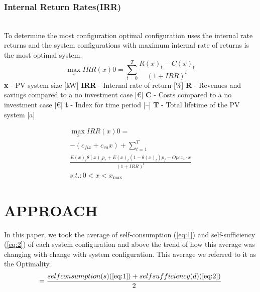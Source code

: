 \documentclass[sigconf,12pt,nonacm]{acmart}
\begin{document}
\subsubsection{Internal Return Rates(IRR)}
\hfill\\
To determine the most configuration optimal configuration \citeauthor{hartner_2017_optimal} \cite{hartner_2017_optimal} uses the internal rate returns and the system configurations with maximum internal rate of returns is the most optimal system. \newline
\begin{equation}\max _{x} I R R(x) 0=\sum_{t=0}^{T} \frac{R(x)_{t}-C(x)_{t}}{(1+I R R)^{t}}\end{equation}
\textbf{x} - PV system size [kW]\newline
\textbf{IRR }- Internal rate of return [\%]\newline
\textbf{R} - Revenues and savings compared to a no investment case [€] \newline
\textbf{C} - Costs compared to a no investment case [€] \newline
\textbf{t} - Index for time period [–] \newline
\textbf{T} - Total lifetime of the PV system [a] \newline

\begin{equation}\begin{array}{c}
\max _{x} I R R(x) 0= \\
-\left(c_{f i x}+c_{v a} x\right)+\sum_{t=1}^{T}\\ \frac{E(x)_{t} \theta(x)_{t} p_{r}+E(x)_{t} \left(1-\theta(x)_{t}\right) p_{f}-O p e x_{t} \cdot x}{(1+I R R)^{t}} \\
s . t .: 0<x<x_{\max }
\end{array}\end{equation}






\section{APPROACH}
In this paper, we took the average of self-consumption (\ref{eq:1}) and self-sufficiency (\ref{eq:2})  of each system configuration and above the trend of how this average was changing with change with system configuration. This average we referred to it as the Optimality.
\begin{equation}
   =\frac{self consumption(s)(\ref{eq:1}) + self sufficiency (d)(\ref{eq:2})}{2}
\end{equation}
\end{document}
